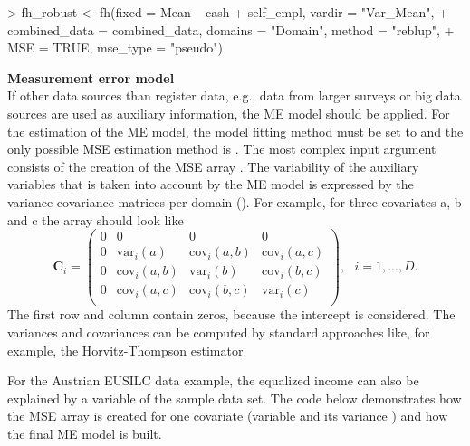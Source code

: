 \begin{example}
> fh_robust <- fh(fixed = Mean ~ cash + self_empl, vardir = "Var_Mean",
+   combined_data = combined_data, domains = "Domain", method = "reblup",
+   MSE = TRUE, mse_type = "pseudo")
\end{example}
\textbf{Measurement error model} \\
If other data sources than register data, e.g., data from larger surveys or big data sources are used as auxiliary information, the ME model should be applied. For the estimation of the ME model, the model fitting method must be set to  and the only possible MSE estimation method is . The most complex input argument consists of the creation of the MSE array . The variability of the auxiliary variables that is taken into account by the ME model is expressed by the variance-covariance matrices per domain (). For example, for three covariates a, b and c the array should look like
%
\begin{equation*}
\boldsymbol{C}_i = \left( \begin{array}{rrrr}
0 & 0 & 0 & 0 \\
0 & \text{var}_i(a) & \text{cov}_i(a,b) & \text{cov}_i(a,c) \\
0 & \text{cov}_i(a,b) & \text{var}_i(b) & \text{cov}_i(b,c) \\
0 & \text{cov}_i(a,c) & \text{cov}_i(b,c) & \text{var}_i(c) \\
\end{array}\right),
\text{   } i = 1,...,D.
\end{equation*}
%
The first row and column contain zeros, because the intercept is considered. The variances and covariances can be computed by standard approaches like, for example, the Horvitz-Thompson estimator.

For the Austrian EUSILC data example, the equalized income can also be explained by a variable of the sample data set. The code below demonstrates how the MSE array  is created for one covariate (variable  and its variance ) and how the final ME model is built.
